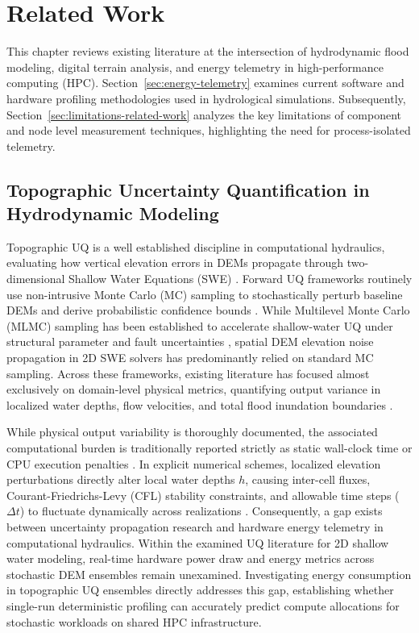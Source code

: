 \chapter{Related Work}
\label{ch:relatedwork}

This chapter reviews existing literature at the intersection of hydrodynamic flood modeling, digital terrain analysis, and energy telemetry in high-performance computing (HPC). Section~\ref{sec:energy-telemetry} examines current software and hardware profiling methodologies used in hydrological simulations. Subsequently, Section~\ref{sec:limitations-related-work} analyzes the key limitations of component and node level measurement techniques, highlighting the need for process-isolated telemetry.

\section{Topographic Uncertainty Quantification in Hydrodynamic Modeling}
\label{subsec:topographic_uq}

Topographic UQ is a well established discipline in computational hydraulics, evaluating how vertical elevation errors in DEMs propagate through two-dimensional Shallow Water Equations (SWE) \cite{Hunter2008, Savage2016, Abily2016}. Forward UQ frameworks routinely use non-intrusive Monte Carlo (MC) sampling to stochastically perturb baseline DEMs and derive probabilistic confidence bounds \cite{Abily2016, Savage2016}. While Multilevel Monte Carlo (MLMC) sampling has been established to accelerate shallow-water UQ under structural parameter and fault uncertainties \cite{SanchezLinares2016}, spatial DEM elevation noise propagation in 2D SWE solvers has predominantly relied on standard MC sampling. Across these frameworks, existing literature has focused almost exclusively on domain-level physical metrics, quantifying output variance in localized water depths, flow velocities, and total flood inundation boundaries \cite{Hunter2008, SanchezLinares2016, Abily2016, Savage2016}.

While physical output variability is thoroughly documented, the associated computational burden is traditionally reported strictly as static wall-clock time or CPU execution penalties \cite{Hunter2008, SanchezLinares2016, Abily2016, Savage2016}. In explicit numerical schemes, localized elevation perturbations directly alter local water depths $h$, causing inter-cell fluxes, Courant-Friedrichs-Levy (CFL) stability constraints, and allowable time steps ($\Delta t$) to fluctuate dynamically across realizations \cite{Hunter2008, SanchezLinares2016, Abily2016, Savage2016}. Consequently, a gap exists between uncertainty propagation research and hardware energy telemetry in computational hydraulics. Within the examined UQ literature for 2D shallow water modeling, real-time hardware power draw and energy metrics across stochastic DEM ensembles remain unexamined. Investigating energy consumption in topographic UQ ensembles directly addresses this gap, establishing whether single-run deterministic profiling can accurately predict compute allocations for stochastic workloads on shared HPC infrastructure.



